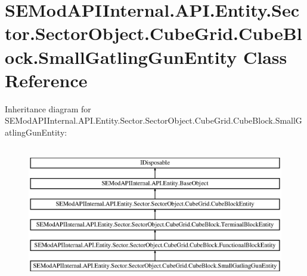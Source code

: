 \hypertarget{class_s_e_mod_a_p_i_internal_1_1_a_p_i_1_1_entity_1_1_sector_1_1_sector_object_1_1_cube_grid_1_1da7f6e1e443b7b445548fcb53da9dcdc}{}\section{S\+E\+Mod\+A\+P\+I\+Internal.\+A\+P\+I.\+Entity.\+Sector.\+Sector\+Object.\+Cube\+Grid.\+Cube\+Block.\+Small\+Gatling\+Gun\+Entity Class Reference}
\label{class_s_e_mod_a_p_i_internal_1_1_a_p_i_1_1_entity_1_1_sector_1_1_sector_object_1_1_cube_grid_1_1da7f6e1e443b7b445548fcb53da9dcdc}
Inheritance diagram for S\+E\+Mod\+A\+P\+I\+Internal.\+A\+P\+I.\+Entity.\+Sector.\+Sector\+Object.\+Cube\+Grid.\+Cube\+Block.\+Small\+Gatling\+Gun\+Entity\+:\begin{figure}[H]
\begin{center}
\leavevmode
\includegraphics[height=6.000000cm]{class_s_e_mod_a_p_i_internal_1_1_a_p_i_1_1_entity_1_1_sector_1_1_sector_object_1_1_cube_grid_1_1da7f6e1e443b7b445548fcb53da9dcdc}
\end{center}
\end{figure}
